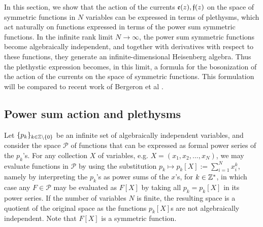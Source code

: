 \label{secboso}
In this section, we show that the action of the currents $\mathfrak{e}(z),\mathfrak{f}(z)$ on the space of symmetric functions in $N$ variables can be expressed in terms of plethysms, which act naturally on functions expressed in terms of the power sum symmetric functions. In the infinite rank limit $N\to\infty$, the power sum symmetric functions become algebraically independent, and together with derivatives with respect to these functions, they generate an infinite-dimensional Heisenberg algebra. Thus the plethystic expression becomes, in this limit, a formula for the bosonization of the action of the currents on the space of symmetric functions. This formulation will be compared to recent work of Bergeron et al \cite{BGLX}. 



\subsection{Power sum action and plethysms}

Let $\{p_k\}_{k\in {\mathbb Z}\setminus\{0\}}$ be an infinite set of algebraically independent variables, and consider 
the space $\mathcal P$ of functions that can be expressed as formal
power series of the $p_k$'s. For any collection $X$ of variables, e.g. $X=(x_1,x_2,...,x_N)$,
we may evaluate functions in $\mathcal P$ by using the substitution 
$p_k\mapsto p_k[X]:=\sum_{i=1}^N x_i^k$, namely by interpreting the $p_k$'s as power sums of the $x$'s, for $k\in {\mathbb Z}^*$, in which case any $F\in {\mathcal P}$ may be evaluated 
as $F[X]$ by taking all $p_k= p_k[X]$ in its power series. If the number of variables $N$ is finite, the resulting space is a quotient of the original space as the functions $p_k[X]$s are not algebraically independent. Note that $F[X]$ is a symmetric function. 

